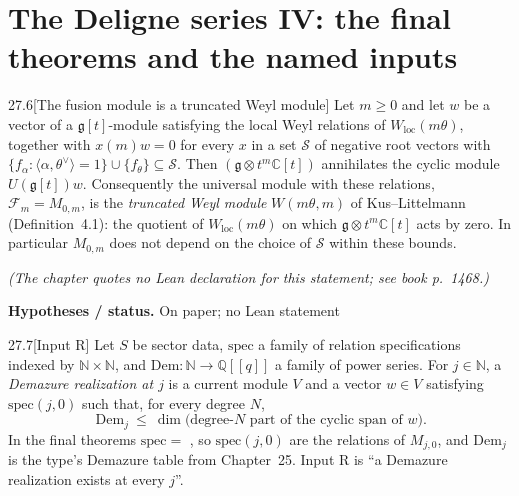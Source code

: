 \documentclass[11pt,openany]{book}
\newcommand{\lean}[1]{\texttt{\detokenize{#1}}}
\theoremstyle{definition}
\theoremstyle{plain}
\newcommand{\C}{{\mathbb{C}}}
\newcommand{\Q}{{\mathbb{Q}}}
\newcommand{\N}{{\mathbb{N}}}
\begin{document}
\chapter[The Deligne series IV: final theorems and named inputs]{The Deligne series IV: the final theorems and the named inputs}
\begingroup
\providecommand{\ltwentyseveng}{\mathfrak g}
\providecommand{\ltwentysevenIns}{I_2^{\mathrm{ns}}}
\providecommand{\ltwentysevenHilb}{\operatorname{Hilb}}
\providecommand{\ltwentysevenvac}{\mathbf 1}
\providecommand{\ltwentysevenJ}{J_\infty}
\providecommand{\ltwentysevenF}{\mathcal F}
\providecommand{\ltwentysevengr}{\operatorname{gr}}
\providecommand{\ltwentysevendg}{d_{\mathfrak g}}
\par\medskip
\begin{blemma}{27.6}[The fusion module is a truncated Weyl module]
Let $m\ge0$ and let $w$ be a vector of a $\ltwentyseveng[t]$-module satisfying the local Weyl relations of
$W_{\mathrm{loc}}(m\theta)$, together with $x(m)w=0$ for every $x$ in a set $\mathcal S$ of negative root vectors with
$\{f_\alpha:\langle\alpha,\theta^\vee\rangle=1\}\cup\{f_\theta\}\subseteq\mathcal S$. Then $(\ltwentyseveng\otimes t^m\C[t])$
annihilates the cyclic module $U(\ltwentyseveng[t])w$. Consequently the universal module with these relations,
$\ltwentysevenF_m=M_{0,m}$, is the \emph{truncated Weyl module} $W(m\theta,m)$ of Kus--Littelmann (Definition~4.1): the
quotient of $W_{\mathrm{loc}}(m\theta)$ on which $\ltwentyseveng\otimes t^m\C[t]$ acts by zero. In particular $M_{0,m}$ does not
depend on the choice of $\mathcal S$ within these bounds.
\end{blemma}
\noindent\emph{(The chapter quotes no Lean declaration for this statement; see book p.~1468.)}\par
\noindent\textbf{Hypotheses / status.} On paper; no Lean statement\par
\medskip
\begin{bdefinition}{27.7}[Input R]
Let $S$ be sector data, $\mathrm{spec}$ a family of relation specifications indexed by $\N\times\N$, and
$\mathrm{Dem}:\N\to\Q[[q]]$ a family of power series. For $j\in\N$, a \emph{Demazure realization at $j$} is a current module
$V$ and a vector $w\in V$ satisfying $\mathrm{spec}(j,0)$ such that, for every degree $N$,
\begin{equation*}
[q^N]\,\mathrm{Dem}_j\ \le\ \dim\bigl(\text{degree-}N\text{ part of the cyclic span of }w\bigr).
\end{equation*}
In the final theorems $\mathrm{spec}=$ \lean{ravFam S}, so $\mathrm{spec}(j,0)$ are the relations of $M_{j,0}$, and $\mathrm{Dem}_j$
is the type's Demazure table from Chapter~25. Input R is ``a Demazure realization exists at every $j$''.
\end{bdefinition}
\end{document}
